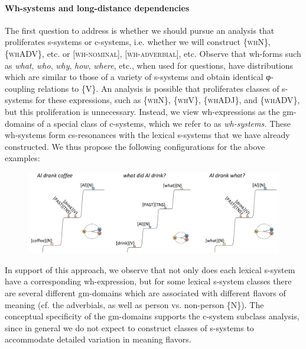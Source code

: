 \paragraph{Wh-systems and long-distance dependencies}

The first question to address is whether we should pursue an analysis that proliferates s-systems or c-systems, i.e. whether we will construct \{\textsc{whN}\}, \{\textsc{whADV}\}, etc. or [\textsc{wh-nominal}], [\textsc{wh-adverbial}], etc. Observe that wh-forms such as \textit{what}, \textit{who}, \textit{why}, \textit{how}, \textit{where}, etc., when used for questions, have distributions which are similar to those of a variety of s-systems and obtain identical φ-coupling relations to \{V\}. An analysis is possible that proliferates classes of s-systems for these expressions, such as \{\textsc{whN}\}, \{\textsc{whV}\}, \{\textsc{whADJ}\}, and \{\textsc{whADV}\}, but this proliferation is unnecessary. Instead, we view wh-expressions as the gm-domains of a special class of c-systems, which we refer to as \textit{wh-systems.} These wh-systems form cs-resonances with the lexical s-systems that we have already constructed. We thus propose the following configurations for the above examples:

  
\begin{figure}
\includegraphics[width=\textwidth]{figures/Tilsen-img158.png}
\caption{\missingcaption}
\label{fig:}
\end{figure}
 

  In support of this approach, we observe that not only does each lexical s-system have a corresponding wh-expression, but for some lexical s-system classes there are several different gm-domains which are associated with different flavors of meaning (cf. the adverbials, as well as person vs. non-person \{N\}). The conceptual specificity of the gm-domains supports the c-system subclass analysis, since in general we do not expect to construct classes of s-systems to accommodate detailed variation in meaning flavors.

